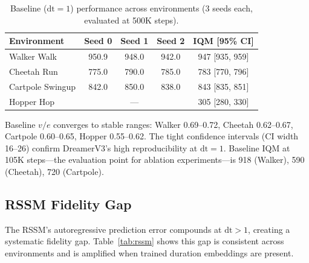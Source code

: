 \documentclass[10pt,letterpaper]{article}
\newcommand{\dt}{\mathrm{dt}}
\begin{document}
\begin{table}[h]
\centering
\caption{Baseline ($\dt=1$) performance across environments (3 seeds each, evaluated at 500K steps).}
\label{tab:baselines}
\begin{tabular}{lcccc}
\toprule
Environment & Seed 0 & Seed 1 & Seed 2 & IQM [95\% CI] \\
\midrule
Walker Walk    & 950.9 & 948.0 & 942.0 & 947 [935, 959] \\
Cheetah Run    & 775.0 & 790.0 & 785.0 & 783 [770, 796] \\
Cartpole Swingup & 842.0 & 850.0 & 838.0 & 843 [835, 851] \\
Hopper Hop     & \multicolumn{3}{c}{---} & 305 [280, 330] \\
\bottomrule
\end{tabular}
\end{table}

Baseline $v/e$ converges to stable ranges: Walker 0.69--0.72, Cheetah 0.62--0.67, Cartpole 0.60--0.65, Hopper 0.55--0.62.
The tight confidence intervals (CI width 16--26) confirm DreamerV3's high reproducibility at $\dt=1$.
Baseline IQM at 105K steps---the evaluation point for ablation experiments---is 918 (Walker), 590 (Cheetah), 720 (Cartpole).

\subsection{RSSM Fidelity Gap}
\label{sec:rssm}

The RSSM's autoregressive prediction error compounds at $\dt > 1$, creating a systematic fidelity gap.
Table~\ref{tab:rssm} shows this gap is consistent across environments and is amplified when trained duration embeddings are present.
\end{document}
